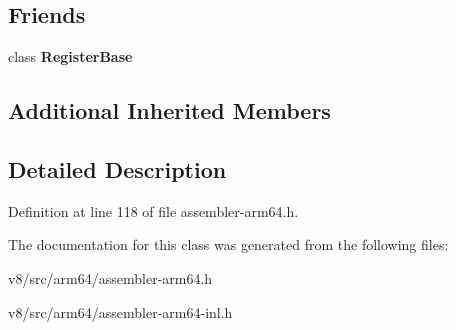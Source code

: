 \subsection*{Friends}
\begin{DoxyCompactItemize}
\item 
\mbox{\label{classv8_1_1internal_1_1CPURegister_a762c32bfc1b920b5ead6f1c087b4a400}} 
class {\bfseries Register\+Base}
\end{DoxyCompactItemize}
\subsection*{Additional Inherited Members}


\subsection{Detailed Description}


Definition at line 118 of file assembler-\/arm64.\+h.



The documentation for this class was generated from the following files\+:\begin{DoxyCompactItemize}
\item 
v8/src/arm64/assembler-\/arm64.\+h\item 
v8/src/arm64/assembler-\/arm64-\/inl.\+h\end{DoxyCompactItemize}

